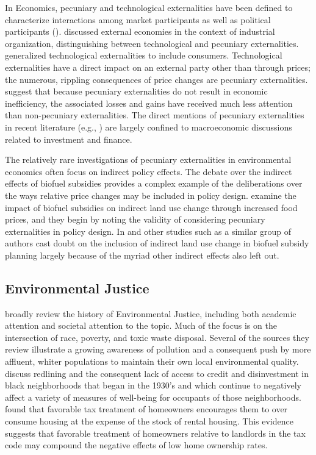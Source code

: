 \documentclass[ecta,nameyear,draft]{econsocart}
\theoremstyle{plain}
\theoremstyle{remark}
\begin{document}
In Economics, pecuniary and technological externalities have been defined to characterize interactions among market participants as well as political participants (\cite{holcombe01}). \cite{scitovsky54} discussed external economies in the context of industrial organization, distinguishing between technological and pecuniary externalities. \cite{buchananstubblebine} generalized technological externalities to include consumers. Technological externalities have a direct impact on an external party other than through prices; the numerous, rippling consequences of price changes are pecuniary externalities. \cite{holcombe01} suggest that because pecuniary externalities do not result in economic inefficiency, the associated losses and gains have received much less attention than non-pecuniary externalities. The direct mentions of pecuniary externalities in recent literature (e.g., \cite{davila18}) are largely confined to macroeconomic discussions related to investment and finance. 

The relatively rare investigations of pecuniary externalities in environmental economics often focus on indirect policy effects. The debate over the indirect effects of biofuel subsidies provides a complex example of the deliberations over the ways relative price changes may be included in policy design. \cite{zilberman11} examine the impact of biofuel subsidies on indirect land use change through increased food prices, and they begin by noting the validity of considering pecuniary externalities in policy design. In \cite{zilberman11} and other studies such as \cite{zilberman13} a similar group of authors cast doubt on the inclusion of indirect land use change in biofuel subsidy planning largely because of the myriad other indirect effects also left out.



\subsection{Environmental Justice} 
\cite{mohai09} broadly review the history of Environmental Justice, including both academic attention and societal attention to the topic. Much of the focus is on the intersection of race, poverty, and toxic waste disposal. Several of the sources they review illustrate a growing awareness of pollution and a consequent push by more affluent, whiter populations to maintain their own local environmental quality.  \cite{aaronson2021} discuss redlining and the consequent lack of access to credit and disinvestment in black neighborhoods that began in the 1930's and which continue to negatively affect a variety of measures of well-being for occupants of those neighborhoods. \cite{gervais2002} found that favorable tax treatment of homeowners encourages them to over consume housing at the expense of the stock of rental housing. This evidence suggests that favorable treatment of homeowners relative to landlords in the tax code may compound the negative effects of low home ownership rates.
\end{document}
